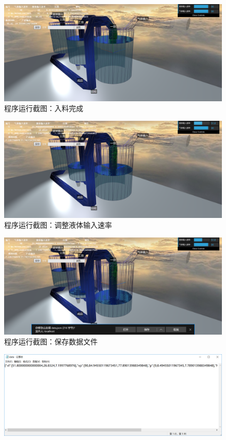 \documentclass[a4paper]{ctexart}
\begin{document}
\begin{spacing}{1.25}
\begin{figure}[htbp]
	\centering
	\includegraphics [width=\textwidth]{figure//res3.png}
	\caption{程序运行截图：入料完成}
\end{figure}
\begin{figure}[htbp]
	\centering
	\includegraphics [width=\textwidth]{figure//res4.png}
	\caption{程序运行截图：调整液体输入速率}
\end{figure}
\begin{figure}[htbp]
	\centering
	\includegraphics [width=\textwidth]{figure//res5.png}
	\caption{程序运行截图：保存数据文件}
\end{figure}
\begin{figure}[htbp]
	\centering
	\includegraphics [width=\textwidth]{figure//res6.png}

\end{figure}
\end{spacing}
\end{document}
